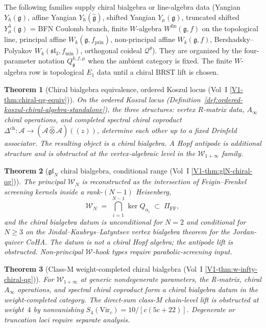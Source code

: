 \documentclass[11pt]{article}
\newtheorem{theorem}{Theorem}[section]
\theoremstyle{remark}
\providecommand{\cA}{\mathcal{A}}
\providecommand{\cQ}{\mathcal{Q}}
\providecommand{\cW}{\mathcal{W}}
\providecommand{\fg}{\mathfrak{g}}
\providecommand{\fgl}{\mathfrak{gl}}
\providecommand{\fsl}{\mathfrak{sl}}
\providecommand{\fkm}{\hat{\mathfrak{g}}}
\providecommand{\Yhbar}{Y_{\hbar}}
\begin{document}
The following families supply chiral bialgebra or line-algebra data
(Yangian
$\Yhbar(\fg)$, affine Yangian $\Yhbar(\fkm)$, shifted Yangian
$Y_\mu(\fg)$, truncated shifted $Y^\lambda_\mu(\fg)$ = BFN Coulomb
branch, finite $W$-algebra $W^{\mathrm{fin}}(\fg, f)$ on the
topological line, principal affine $W_k(\fg, f_{\mathrm{prin}})$,
non-principal affine
$W_k(\fg, f)$, Bershadsky--Polyakov $W_k(\fsl_3, f_{\mathrm{min}})$,
orthogonal coideal $\cQ^\theta$).  They are organized by the
four-parameter notation $Q_\fg^{k, f, \mu}$ when the ambient category is
fixed.  The finite $W$-algebra row is topological $E_1$ data until a
chiral BRST lift is chosen.

\begin{theorem}[Chiral bialgebra equivalence, ordered Koszul locus
(Vol~I
\ref*{V1-thm:chiral-qg-equiv})]%
\label{thm:chiral-bialgebra-equiv-standalone}%
On the ordered Koszul locus
(Definition~\ref{def:ordered-koszul-chiral-algebra-standalone}), the
three structures: vertex $R$-matrix data, $A_\infty$ chiral
operations, and completed spectral chiral coproduct
$\Delta^{\mathrm{ch}}\colon \cA\to(\cA\widehat{\otimes}\cA)((z))$,
determine each other up to a fixed Drinfeld associator.  The resulting
object is a chiral bialgebra.  A Hopf antipode is additional structure
and is obstructed at the vertex-algebraic level in the
$\cW_{1+\infty}$ family.
\end{theorem}

\begin{theorem}[$\fgl_N$ chiral bialgebra, conditional range
(Vol~I
\ref*{V1-thm:glN-chiral-qg})]%
\label{thm:gl-N-chiral-qg-conditional-standalone}%
The principal $\cW_N$ is reconstructed as the intersection of
Feigin--Frenkel screening kernels inside a rank-$(N-1)$ Heisenberg,
\[
  \cW_N \;=\;
  \bigcap_{i=1}^{N-1} \ker Q_{\alpha_i} \;\subset\; \Pi_{\mathrm{FF}},
\]
and the chiral bialgebra datum is unconditional for $N=2$ and
conditional for $N\ge3$ on the Jindal--Kaubrys--Latyntsev vertex
bialgebra theorem for the Jordan-quiver CoHA.  The datum is not a
chiral Hopf algebra; the antipode lift is obstructed.
Non-principal $\cW$-hook types require parabolic-screening input.
\end{theorem}

\begin{theorem}[Class-M weight-completed chiral bialgebra (Vol~I
\ref*{V1-thm:w-infty-chiral-qg})]%
\label{thm:w-infty-chiral-qg-standalone}%
For $\cW_{1+\infty}$ at generic nondegenerate parameters, the
R-matrix, chiral $A_\infty$ operations, and spectral chiral coproduct
form a chiral bialgebra datum in the weight-completed category.  The
direct-sum class-M chain-level lift is obstructed at weight~$4$ by
nonvanishing $S_4(\mathrm{Vir}_c) = 10/[c(5c+22)]$.  Degenerate or
truncation loci require separate analysis.
\end{theorem}
\end{document}
